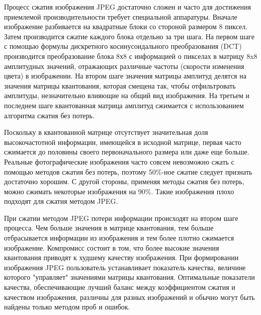 ﻿\documentclass[a4paper,12pt]{article}
\theoremstyle{plain}
\begin{document}
Процесс сжатия изображения JPEG достаточно сложен и часто для достижения приемлемой производительности требует специальной аппаратуры. Вначале изображение разбивается на квадратные блоки со стороной размером 8 пиксел. Затем производится сжатие каждого блока отдельно за три шага. На первом шаге с помощью формулы дискретного косинусоидального преобразования (DCT) производится преобразование блока 8х8 с информацией о пикселах в матрицу 8x8 амплитудных значений, отражающих различные частоты (скорости изменения цвета) в изображении. На втором шаге значения матрицы амплитуд делятся на значения матрицы квантования, которая смещена так, чтобы отфильтровать амплитуды, незначительно влияющие на общий вид изображения. На третьем и последнем шаге квантованная матрица амплитуд сжимается с использованием алгоритма сжатия без потерь.

Поскольку в квантованной матрице отсутствует значительная доля высокочастотной информации, имеющейся в исходной матрице, первая часто сжимается до половины своего первоначального размера или даже еще больше. Реальные фотографические изображения часто совсем невозможно сжать с помощью методов сжатия без потерь, поэтому 50\%-ное сжатие следует признать достаточно хорошим. С другой стороны, применяя методы сжатия без потерь, можно сжимать некоторые изображения на 90\%. Такие изображения плохо подходят для сжатия методом JPEG.

При сжатии методом JPEG потери информации происходят на втором шаге процесса. Чем больше значения в матрице квантования, тем больше отбрасывается информации из изображения и тем более плотно сжимается изображение. Компромисс состоит в том, что более высокие значения квантования приводят к худшему качеству изображения. При формировании изображения JPEG пользователь устанавливает показатель качества, величине которого "управляет" значениями матрицы квантования. Оптимальные показатели качества, обеспечивающие лучший баланс между коэффициентом сжатия и качеством изображения, различны для разных изображений и обычно могут быть найдены только методом проб и ошибок.
\end{document}
